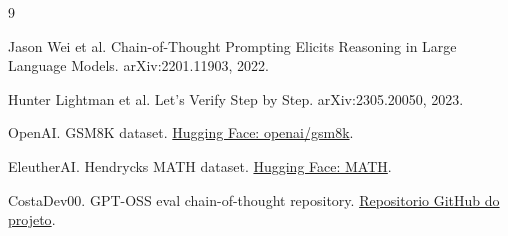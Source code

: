 \documentclass[a4paper,12pt]{article}
\begin{document}
\begin{thebibliography}{9}

Jason Wei et al.
\newblock Chain-of-Thought Prompting Elicits Reasoning in Large Language Models.
\newblock arXiv:2201.11903, 2022.

Hunter Lightman et al.
\newblock Let's Verify Step by Step.
\newblock arXiv:2305.20050, 2023.

OpenAI.
\newblock GSM8K dataset.
\newblock \href{https://huggingface.co/datasets/openai/gsm8k}{Hugging Face:
openai/gsm8k}.

EleutherAI.
\newblock Hendrycks MATH dataset.
\newblock \href{https://huggingface.co/datasets/EleutherAI/hendrycks_math}{Hugging
Face: MATH}.

CostaDev00.
\newblock GPT-OSS eval chain-of-thought repository.
\newblock \href{https://github.com/costadev00/gpt-oss-eval-chain-of-thought}{Repositorio
GitHub do projeto}.

\end{thebibliography}
\end{document}
